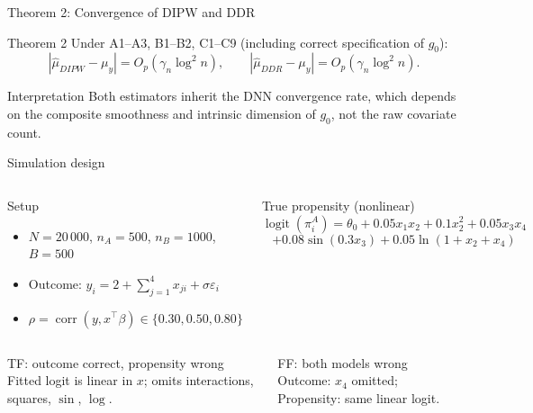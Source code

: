 \documentclass[aspectratio=169,11pt]{beamer}
\begin{document}
\begin{frame}{Theorem 2: Convergence of DIPW and DDR}
\begin{block}{Theorem 2}
Under A1--A3, B1--B2, C1--C9 (including correct specification of $g_0$):
\[
|\hat{\mu}_{DIPW}-\mu_y|=O_p(\gamma_n\log^2 n),\qquad
|\hat{\mu}_{DDR}-\mu_y|=O_p(\gamma_n\log^2 n).
\]
\end{block}
\begin{block}{Interpretation}
Both estimators inherit the DNN convergence rate, which depends on the composite smoothness and intrinsic dimension of $g_0$, not the raw covariate count.
\end{block}
\end{frame}


\begin{frame}{Simulation design}
\begin{columns}[T]
\begin{block}{Setup}
\begin{itemize}
  \item $N=20\,000$, $n_A=500$, $n_B=1000$, $B=500$
  \item Outcome: $y_i = 2 + \sum_{j=1}^4 x_{ji} + \sigma\varepsilon_i$
  \item $\rho=\operatorname{corr}(y,x^{\top}\beta)\in\{0.30,0.50,0.80\}$
\end{itemize}
\end{block}
\begin{block}{True propensity (nonlinear)}
\footnotesize
\[
\operatorname{logit}(\pi_i^A)=\theta_0 + 0.05x_1x_2+0.1x_2^2+0.05x_3x_4
\]
\[
+0.08\sin(0.3x_3)+0.05\ln(1+x_2+x_4)
\]
\normalsize
\end{block}
\end{columns}
\vspace{0.2cm}
\begin{columns}[T]
\begin{block}{TF: outcome correct, propensity wrong}
Fitted logit is linear in $x$; omits interactions, squares, $\sin$, $\log$.
\end{block}
\begin{block}{FF: both models wrong}
Outcome: $x_4$ omitted; Propensity: same linear logit.
\end{block}
\end{columns}
\end{frame}
\end{document}
